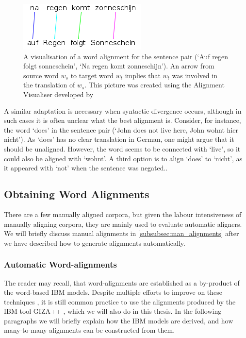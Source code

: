 \documentclass{report}
\begin{document}
\begin{figure}
\begin{framed}
\centering
\includegraphics[scale=0.6]{alignment.png}
\caption{A visualisation of a word alignment for the sentence pair (`Auf regen folgt sonneschein', `Na regen komt zonneschijn'). An arrow from source word $w_s$ to target word $w_t$ implies that $w_t$ was involved in the translation of $w_s$. This picture was created using the Alignment Visualiser developed by \cite{maillette2010visualizing}}
\label{fig:alignment}
\end{framed}
\end{figure}

A similar adaptation is necessary when syntactic divergence occurs, although in such cases it is often unclear what the best alignment is. Consider, for instance, the word `does' in the sentence pair (`John does not live here, John wohnt hier nicht'). As `does' has no clear translation in German, one might argue that it should be unaligned. However, the word seems to be connected with `live', so it could also be aligned with `wohnt'. A third option is to align `does' to `nicht', as it appeared with `not' when the sentence was negated.\citep[Example from][p.114]{koehn2008statistical}.



\subsection{Obtaining Word Alignments}

There are a few manually aligned corpora, but given the labour intensiveness of manually aligning corpora, they are mainly used to evaluate automatic aligners. We will briefly discuss manual alignments in \ref{subsubsec:man_alignments} after we have described how to generate alignments automatically.

\subsubsection{Automatic Word-alignments}

The reader may recall, that word-alignments are established as a by-product of the word-based IBM models. Despite multiple efforts to improve on these techniques \citep[see][p.119-122 for some examples]{koehn2008statistical}, it is still common practice to use the alignments produced by the IBM tool GIZA++ \citep{koehn2007moses}, which we will also do in this thesis. In the following 
paragraphs we will briefly explain how the IBM models are derived, and how many-to-many alignments can be constructed from them.
\end{document}
